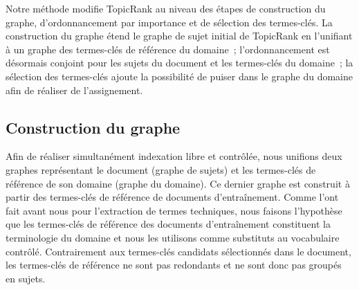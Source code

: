   Notre méthode modifie TopicRank au niveau des étapes de construction du
  graphe, d'ordonnancement par importance et de sélection des termes-clés. La
  construction du graphe étend le graphe de sujet initial de TopicRank en
  l'unifiant à un graphe des termes-clés de référence du domaine~;
  l'ordonnancement est désormais conjoint pour les sujets du document et les
  termes-clés du domaine~; la sélection des termes-clés ajoute la possibilité de
  puiser dans le graphe du domaine afin de réaliser de l'assignement.

  \subsection{Construction du graphe}
  \label{subsec:main-domain_specific_keyphrase_annotation-supervised_automatic_keyphrase_extraction-topiccorank-graph_construction}
    Afin de réaliser simultanément indexation libre et contrôlée, nous unifions
    deux graphes représentant le document (graphe de sujets) et les termes-clés
    de référence de son domaine (graphe du domaine). Ce dernier graphe est
    construit à partir des termes-clés de référence de documents d'entraînement.
    Comme  l'ont fait avant nous
    pour l'extraction de termes techniques, nous faisons l'hypothèse que les
    termes-clés de référence des documents d'entraînement constituent la
    terminologie du domaine et nous les utilisons comme substituts au
    vocabulaire contrôlé. Contrairement aux termes-clés candidats sélectionnés
    dans le document, les termes-clés de référence ne sont pas redondants et ne
    sont donc pas groupés en sujets.

